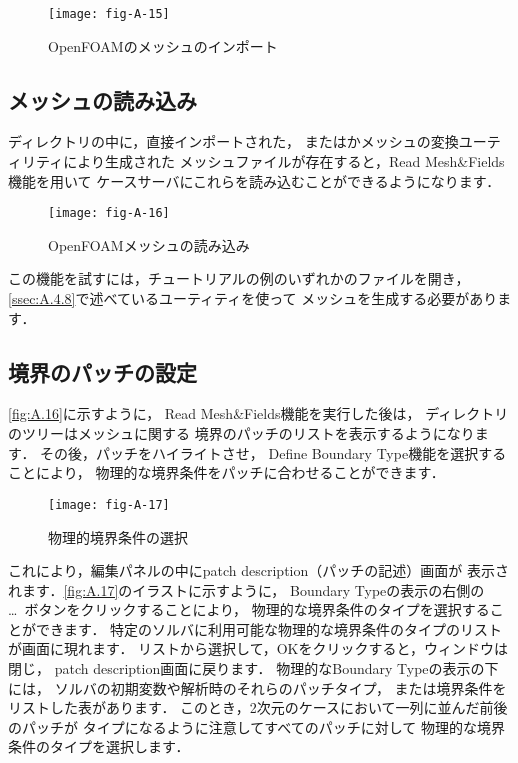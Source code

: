\begin{figure}[ht]
 \texttt{[image: fig-A-15]}
 \caption{OpenFOAMのメッシュのインポート}
 \label{fig:A.15}
\end{figure}


\subsection{メッシュの読み込み}
\label{ssec:A.4.2}
ディレクトリの中に，直接インポートされた，
またはかメッシュの変換ユーティリティにより生成された
メッシュファイルが存在すると，Read Mesh\&Fields機能を用いて
ケースサーバにこれらを読み込むことができるようになります．


\begin{figure}[ht]
 \texttt{[image: fig-A-16]}
 \caption{OpenFOAMメッシュの読み込み}
 \label{fig:A.16}
\end{figure}


この機能を試すには，チュートリアルの例のいずれかのファイルを開き，
\autoref{ssec:A.4.8}で述べているユーティティを使って
メッシュを生成する必要があります．


\subsection{境界のパッチの設定}
\label{ssec:A.4.3}
\autoref{fig:A.16}に示すように，
Read Mesh\&Fields機能を実行した後は，
ディレクトリのツリーはメッシュに関する
境界のパッチのリストを表示するようになります．
その後，パッチをハイライトさせ，
Define Boundary Type機能を選択することにより，
物理的な境界条件をパッチに合わせることができます．


\begin{figure}[ht]
 \texttt{[image: fig-A-17]}
 \caption{物理的境界条件の選択}
 \label{fig:A.17}
\end{figure}


これにより，編集パネルの中にpatch description（パッチの記述）画面が
表示されます．\autoref{fig:A.17}のイラストに示すように，
Boundary Typeの表示の右側の \ldots\ ボタンをクリックすることにより，
物理的な境界条件のタイプを選択することができます．
特定のソルバに利用可能な物理的な境界条件のタイプのリストが画面に現れます．
リストから選択して，OKをクリックすると，ウィンドウは閉じ，
patch description画面に戻ります．
物理的なBoundary Typeの表示の下には，
ソルバの初期変数や解析時のそれらのパッチタイプ，
または境界条件をリストした表があります．
このとき，2次元のケースにおいて一列に並んだ前後のパッチが
%
%
タイプになるように注意してすべてのパッチに対して
物理的な境界条件のタイプを選択します．


